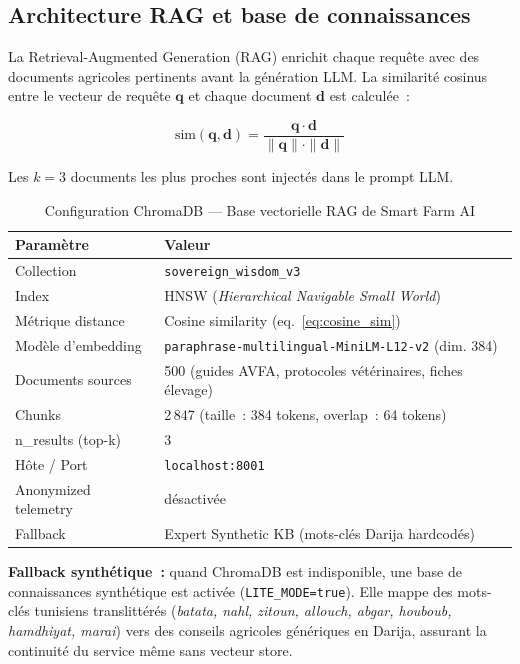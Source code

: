 \subsection{Architecture RAG et base de connaissances}
\label{subsec:rag_architecture}

La Retrieval-Augmented Generation (RAG) enrichit chaque requête avec des documents
agricoles pertinents avant la génération LLM. La similarité cosinus entre le vecteur
de requête $\mathbf{q}$ et chaque document $\mathbf{d}$ est calculée~:

\begin{equation}
\text{sim}(\mathbf{q}, \mathbf{d}) = \frac{\mathbf{q} \cdot \mathbf{d}}
                                          {\|\mathbf{q}\| \cdot \|\mathbf{d}\|}
\label{eq:cosine_sim}
\end{equation}

Les $k = 3$ documents les plus proches sont injectés dans le prompt LLM.

\begin{table}[H]
\centering
\caption{Configuration ChromaDB --- Base vectorielle RAG de Smart Farm AI}
\label{tab:rag_config}
\begin{tabular}{ll}
\toprule
\textbf{Paramètre} & \textbf{Valeur} \\
\midrule
Collection         & \texttt{sovereign\_wisdom\_v3} \\
Index              & HNSW (\textit{Hierarchical Navigable Small World}) \\
Métrique distance  & Cosine similarity (eq.~\ref{eq:cosine_sim}) \\
Modèle d'embedding & \texttt{paraphrase-multilingual-MiniLM-L12-v2} (dim. 384) \\
Documents sources  & 500 (guides AVFA, protocoles vétérinaires, fiches élevage) \\
Chunks             & 2\,847 (taille~: 384 tokens, overlap~: 64 tokens) \\
n\_results (top-k) & 3 \\
Hôte / Port        & \texttt{localhost:8001} \\
Anonymized telemetry & désactivée \\
Fallback           & Expert Synthetic KB (mots-clés Darija hardcodés) \\
\bottomrule
\end{tabular}
\end{table}

\textbf{Fallback synthétique~:} quand ChromaDB est indisponible, une base de
connaissances synthétique est activée (\texttt{LITE\_MODE=true}). Elle mappe des
mots-clés tunisiens translittérés (\textit{batata, nahl, zitoun, allouch, abgar, houboub, hamdhiyat, marai}) vers des conseils agricoles génériques en Darija, assurant la continuité
du service même sans vecteur store.

